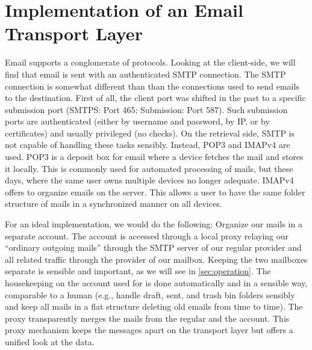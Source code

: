 \section{Implementation of an Email Transport Layer}
Email supports a conglomerate of protocols. Looking at the client-side, we will find that email is sent with an authenticated SMTP connection. The SMTP connection is somewhat different than than the connections used to send emails to the destination. First of all, the client port was shifted in the past to a specific submission port (SMTPS: Port 465; Submission: Port 587). Such submission ports are authenticated (either by username and password, by IP, or by certificates) and usually privileged (no  checks). On the retrieval side, SMTP is not capable of handling these tasks sensibly. Instead, POP3 and IMAPv4 are used. POP3 is a deposit box for email where a device fetches the mail and stores it locally. This is commonly used for automated processing of mails, but these days, where the same user owns multiple devices no longer adequate. IMAPv4 offers to organize emails on the server. This allows a user to have the same folder structure of mails in a synchronized manner on all devices.

For an ideal implementation, we would do the following: Organize our \MessageVortex{} mails in a separate account. The account is accessed through a local proxy relaying our ``ordinary outgoing mails'' through the SMTP server of our regular provider and all \MessageVortex{} related traffic through the provider of our \MessageVortex{} mailbox. Keeping the two mailboxes separate is sensible and important, as we will see in \cref{sec:operation}. The housekeeping on the account used for \MessageVortex{} is done automatically and in a sensible way, comparable to a human (e.g., handle draft, sent, and trash bin folders sensibly and keep all mails in a flat structure deleting old emails from time to time). The proxy transparently merges the mails from the regular and the \MessageVortex{} account. This proxy mechanism keeps the messages apart on the transport layer but offers a unified look at the data.

